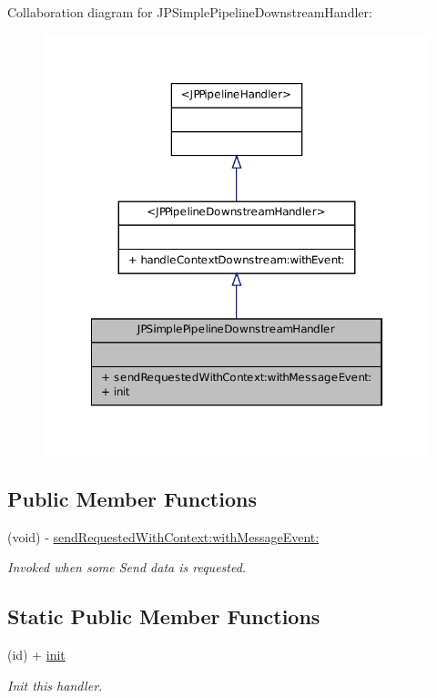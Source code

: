 Collaboration diagram for JPSimplePipelineDownstreamHandler:\nopagebreak
\begin{figure}[H]
\begin{center}
\leavevmode
\includegraphics[width=322pt]{a00159}
\end{center}
\end{figure}
\subsection*{Public Member Functions}
\begin{DoxyCompactItemize}
\item 
(void) -\/ \hyperlink{a00037_a609e49c4f7c71002a13003112c2f6349}{sendRequestedWithContext:withMessageEvent:}
\begin{DoxyCompactList}\small\item\em Invoked when some Send data is requested. \item\end{DoxyCompactList}\end{DoxyCompactItemize}
\subsection*{Static Public Member Functions}
\begin{DoxyCompactItemize}
\item 
\hypertarget{a00037_abb497c02fc2f0a33f471a4c88d623205}{
(id) + \hyperlink{a00037_abb497c02fc2f0a33f471a4c88d623205}{init}}
\label{a00037_abb497c02fc2f0a33f471a4c88d623205}

\begin{DoxyCompactList}\small\item\em Init this handler. \item\end{DoxyCompactList}\end{DoxyCompactItemize}



